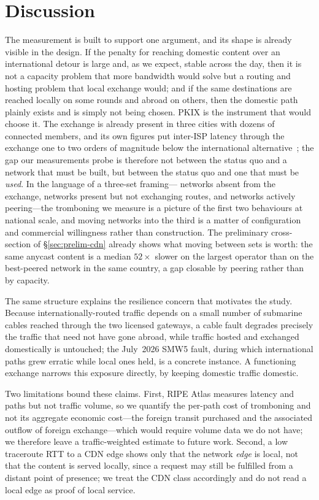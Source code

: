 \documentclass[sigconf,anonymous,10pt]{acmart}
\begin{document}
\section{Discussion}
The measurement is built to support one argument, and its shape is already visible in the design. If
the penalty for reaching domestic content over an international detour is large and, as we expect,
stable across the day, then it is not a capacity problem that more bandwidth would solve but a
routing and hosting problem that local exchange would; and if the same destinations are reached
locally on some rounds and abroad on others, then the domestic path plainly exists and is simply not
being chosen. PKIX is the instrument that would choose it. The exchange is already present in three
cities with dozens of connected members, and its own figures put inter-ISP latency through the
exchange one to two orders of magnitude below the international alternative~\cite{pta2026}; the gap
our measurements probe is therefore not between the status quo and a network that must be built, but
between the status quo and one that must be \emph{used}. In the language of a three-set framing---
networks absent from the exchange, networks present but not exchanging routes, and networks actively
peering---the tromboning we measure is a picture of the first two behaviours at national scale, and
moving networks into the third is a matter of configuration and commercial willingness rather than
construction. The preliminary cross-section of \S\ref{sec:prelim-cdn} already shows what moving
between sets is worth: the same anycast content is a median $52\times$ slower on the largest
operator than on the best-peered network in the same country, a gap closable by peering rather
than by capacity.

The same structure explains the resilience concern that motivates the study. Because
internationally-routed traffic depends on a small number of submarine cables reached through the two
licensed gateways, a cable fault degrades precisely the traffic that need not have gone abroad,
while traffic hosted and exchanged domestically is untouched; the July~2026 SMW5 fault, during which
international paths grew erratic while local ones held, is a concrete instance. A functioning
exchange narrows this exposure directly, by keeping domestic traffic domestic.

Two limitations bound these claims. First, RIPE Atlas measures latency and paths but not traffic
volume, so we quantify the per-path cost of tromboning and not its aggregate economic cost---the
foreign transit purchased and the associated outflow of foreign exchange---which would require
volume data we do not have; we therefore leave a traffic-weighted estimate to future work. Second, a
low traceroute RTT to a CDN edge shows only that the network \emph{edge} is local, not that the
content is served locally, since a request may still be fulfilled from a distant point of presence;
we treat the CDN class accordingly and do not read a local edge as proof of local service.
\end{document}

